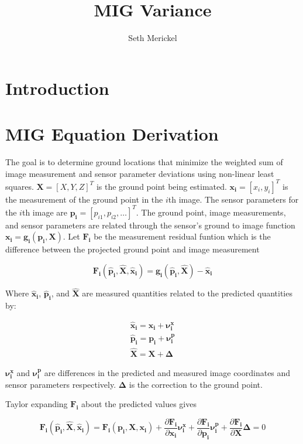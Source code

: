 \documentclass[]{article}
\title{MIG Variance}
\author{Seth Merickel}
\newcommand{\imgmeashat}{\pmb{\hat{x}_{i}}}
\newcommand{\imgmeas}{\pmb{x_{i}}}
\newcommand{\grndhat}{\pmb{\hat{X}}}
\newcommand{\grnd}{\pmb{X}}
\newcommand{\sensmeashat}{\pmb{\hat{p}_i}}
\newcommand{\sensmeas}{\pmb{p_i}}
\newcommand{\imgnu}{\pmb{\nu_{i}^x}}
\newcommand{\sensnu}{\pmb{\nu_i^p}}
\newcommand{\grndupdate}{\pmb{\Delta}}
\newcommand{\Fimgpartials}{\frac{\partial{\pmb{F_{i}}}}{\partial{\imgmeas}}}
\newcommand{\Fgrndpartials}{\frac{\partial{\pmb{F_{i}}}}{\partial{\grnd}}}
\newcommand{\Fsenspartials}{\frac{\partial{\pmb{F_{i}}}}{\partial{\sensmeas}}}
\begin{document}
\maketitle


\section*{Introduction}


\section*{MIG Equation Derivation}
The goal is to determine ground locations that minimize the weighted sum of image measurement and sensor parameter deviations using non-linear least squares.  $\grnd = [X, Y, Z]^T$ is the ground point being estimated.  $\imgmeas = [x_{i}, y_{i}]^T$ is the measurement of the ground point in the $i$th image.  The sensor parameters for the $i$th image are $\sensmeas = [p_{i1}, p_{i2}, \ldots]^T$. The ground point, image measurements, and sensor parameters are related through the sensor's ground to image function $\imgmeas = \pmb{g_i}(\sensmeas, \grnd)$.  Let $\pmb{F_{i}}$ be the measurement residual funtion which is the difference between the projected ground point and image measurement

\begin{equation*}
\pmb{F_{i}}(\sensmeashat, \grndhat,\imgmeashat)=\pmb{g_i}(\sensmeashat,\grndhat)-\imgmeashat
\end{equation*}

Where $\imgmeashat$, $\sensmeashat$, and $\grndhat$ are measured quantities related to the predicted quantities by:

\begin{equation*}
\begin{split}
\imgmeashat = \imgmeas + \imgnu\\
\sensmeashat    = \sensmeas + \sensnu\\
\grndhat    = \grnd + \grndupdate
\end{split}
\end{equation*}

$\imgnu$ and $\sensnu$ are differences in the predicted and measured image coordinates and sensor parameters respectively.  $\grndupdate$ is the correction to the ground point.

Taylor expanding $\pmb{F_{i}}$ about the predicted values gives

\begin{equation} \label{taylor_eq}
\pmb{F_{i}}(\sensmeashat, \grndhat, \imgmeashat) = 
\pmb{F_{i}}(\sensmeas, \grnd, \imgmeas) + \Fimgpartials\imgnu + \Fsenspartials\sensnu + \Fgrndpartials\grndupdate = 0
\end{equation}
\end{document}
